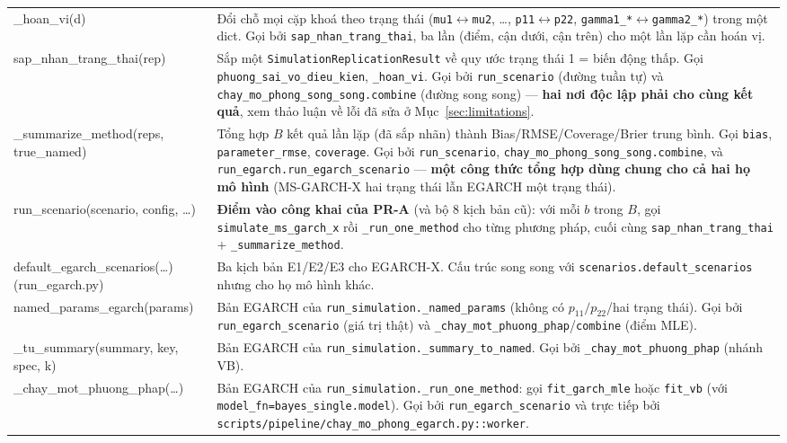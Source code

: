 \documentclass[11pt,a4paper]{article}
\newcommand{\code}[1]{\texttt{#1}}
\begin{document}
\begin{longtable}{@{}>{\ttfamily\scriptsize\raggedright\arraybackslash}p{5.0cm} >{\raggedright\arraybackslash}p{9.5cm}@{}}
\_hoan\_vi(d) & Đổi chỗ mọi cặp khoá theo trạng thái (\code{mu1}$\leftrightarrow$\code{mu2}, \ldots, \code{p11}$\leftrightarrow$\code{p22}, \code{gamma1\_*}$\leftrightarrow$\code{gamma2\_*}) trong một dict. Gọi bởi \code{sap\_nhan\_trang\_thai}, ba lần (điểm, cận dưới, cận trên) cho một lần lặp cần hoán vị. \\
sap\_nhan\_trang\_thai(rep) & Sắp một \code{SimulationReplicationResult} về quy ước trạng thái 1 = biến động thấp. Gọi \code{phuong\_sai\_vo\_dieu\_kien}, \code{\_hoan\_vi}. Gọi bởi \code{run\_scenario} (đường tuần tự) và \code{chay\_mo\_phong\_song\_song.combine} (đường song song) --- \textbf{hai nơi độc lập phải cho cùng kết quả}, xem thảo luận về lỗi đã sửa ở Mục~\ref{sec:limitations}. \\
\_summarize\_method(reps, true\_named) & Tổng hợp $B$ kết quả lần lặp (đã sắp nhãn) thành Bias/RMSE/Coverage/Brier trung bình. Gọi \code{bias}, \code{parameter\_rmse}, \code{coverage}. Gọi bởi \code{run\_scenario}, \code{chay\_mo\_phong\_song\_song.combine}, và \code{run\_egarch.run\_egarch\_scenario} --- \textbf{một công thức tổng hợp dùng chung cho cả hai họ mô hình} (MS-GARCH-X hai trạng thái lẫn EGARCH một trạng thái). \\
run\_scenario(scenario, config, \ldots) & \textbf{Điểm vào công khai của PR-A} (và bộ 8 kịch bản cũ): với mỗi $b$ trong $B$, gọi \code{simulate\_ms\_garch\_x} rồi \code{\_run\_one\_method} cho từng phương pháp, cuối cùng \code{sap\_nhan\_trang\_thai} + \code{\_summarize\_method}. \\
default\_egarch\_scenarios(\ldots) \newline \footnotesize{(run\_egarch.py)} & Ba kịch bản E1/E2/E3 cho EGARCH-X. Cấu trúc song song với \code{scenarios.default\_scenarios} nhưng cho họ mô hình khác. \\
named\_params\_egarch(params) & Bản EGARCH của \code{run\_simulation.\_named\_params} (không có $p_{11}/p_{22}$/hai trạng thái). Gọi bởi \code{run\_egarch\_scenario} (giá trị thật) và \code{\_chay\_mot\_phuong\_phap}/\code{combine} (điểm MLE). \\
\_tu\_summary(summary, key, spec, k) & Bản EGARCH của \code{run\_simulation.\_summary\_to\_named}. Gọi bởi \code{\_chay\_mot\_phuong\_phap} (nhánh VB). \\
\_chay\_mot\_phuong\_phap(\ldots) & Bản EGARCH của \code{run\_simulation.\_run\_one\_method}: gọi \code{fit\_garch\_mle} hoặc \code{fit\_vb} (với \code{model\_fn=bayes\_single.model}). Gọi bởi \code{run\_egarch\_scenario} và trực tiếp bởi \code{scripts/pipeline/chay\_mo\_phong\_egarch.py::worker}. \\

\end{longtable}
\end{document}
